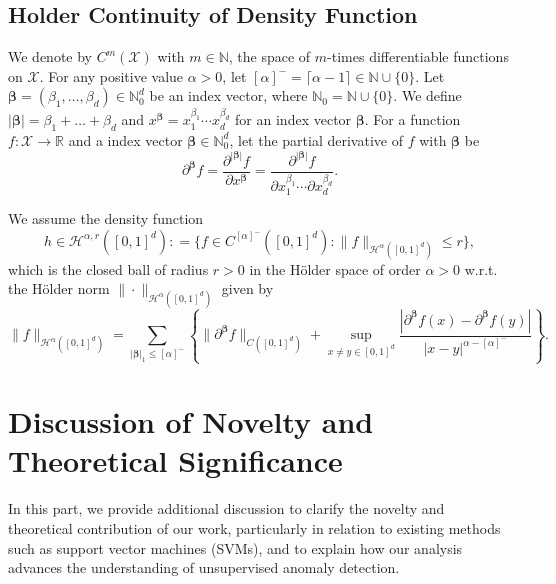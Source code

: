 \documentclass{article}
\def\NN{\mathbb N}
\def\RR{\mathbb R}
\begin{document}
\subsection{Holder Continuity of Density Function }
We denote by 
$C^m(\mathcal{X})$ with $m\in\mathbb{N}$, the space of $m$-times differentiable functions on $\mathcal{X}$.
For any positive value $\alpha >0$, let $[\alpha]^- = \lceil \alpha-1 \rceil \in \NN \cup \{0\}$.
Let $\bm \beta = (\beta_1, \ldots, \beta_d)\in \NN_0^d$ be an index vector, where $\NN_0 = \NN \cup \{0\}$. 
We define $|\bm \beta| =\beta_1+ \ldots+ \beta_d $ and $x^{\bm \beta} = x_1^{\beta_1}\cdots x_d^{\beta_d}$ for an index vector $\bm \beta$. For a function $f:\mathcal{X} \to \RR$ and a index vector $\bm \beta \in \NN_0^d$, let the partial derivative of $f$ with $\bm \beta$ be 
\begin{equation*}
    \partial^{\bm \beta} f = \frac{\partial^{|\bm \beta|}f}{\partial x^{\bm \beta}} = \frac{\partial^{|\bm \beta|}f}{\partial x_1^{\beta_1}\cdots \partial x_d^{\beta_d}}. 
\end{equation*}

We assume the density function
\begin{equation}\label{holder}
h \in \mathcal{H}^{\alpha,r}\left([0,1]^d\right) : = \{f\in C^{[\alpha]^-} \left([0,1]^d\right): \|f\|_{\mathcal{H^{\alpha}}\left([0,1]^d\right)}\leq r\},
\end{equation}
which is the closed ball of radius $r>0$ in the Hölder space of order $\alpha >0$ w.r.t. the  Hölder norm $\|\cdot\|_{\mathcal{H^{\alpha}}([0,1]^d)}$ given by
\begin{equation*}
    \|f\|_{\mathcal{H^{\alpha}}([0,1]^d)} = \sum_{|\bm \beta|_1 \leq [\alpha]^-} \left\{\|\partial^{\bm \beta} f\|_{C([0,1]^d)} + \sup_{x \neq y \in [0,1]^d} \frac{\left|\partial^{\bm \beta} f(x) - \partial^{\bm \beta} f(y)\right|}{|x-y|^{\alpha - [\alpha]^-}} \right\}. 
\end{equation*}





\section{Discussion of Novelty and Theoretical Significance}

In this part, we provide additional discussion to clarify the novelty and theoretical contribution of our work, particularly in relation to existing methods such as support vector machines (SVMs), and to explain how our analysis advances the understanding of unsupervised anomaly detection.
\end{document}
